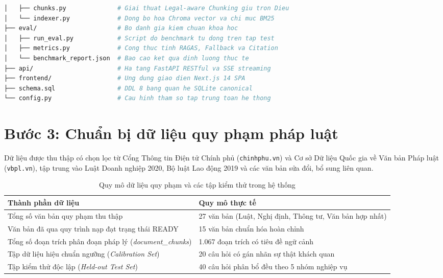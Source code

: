 \begin{lstlisting}[language=bash, caption={Cấu trúc cây thư mục chuẩn hóa của Legal CRAG Assistant}]
│   ├── chunks.py              # Giai thuat Legal-aware Chunking giu tron Dieu
│   └── indexer.py             # Dong bo hoa Chroma vector va chi muc BM25
├── eval/                      # Bo danh gia kiem chuan khoa hoc
│   ├── run_eval.py            # Script do benchmark tu dong tren tap test
│   ├── metrics.py             # Cong thuc tinh RAGAS, Fallback va Citation
│   └── benchmark_report.json  # Bao cao ket qua dinh luong thuc te
├── api/                       # Ha tang FastAPI RESTful va SSE streaming
├── frontend/                  # Ung dung giao dien Next.js 14 SPA
├── schema.sql                 # DDL 8 bang quan he SQLite canonical
└── config.py                  # Cau hinh tham so tap trung toan he thong
\end{lstlisting}

\section{Bước 3: Chuẩn bị dữ liệu quy phạm pháp luật}

Dữ liệu được thu thập có chọn lọc từ Cổng Thông tin Điện tử Chính phủ (\texttt{chinhphu.vn}) và Cơ sở Dữ liệu Quốc gia về Văn bản Pháp luật (\texttt{vbpl.vn}), tập trung vào Luật Doanh nghiệp 2020, Bộ luật Lao động 2019 và các văn bản sửa đổi, bổ sung liên quan.

\begin{table}[htbp]
\centering
\caption{Quy mô dữ liệu quy phạm và các tập kiểm thử trong hệ thống}
\label{tab:corpus_scale}
\renewcommand{\arraystretch}{1.25}
\begin{tabularx}{\textwidth}{L{6.0cm} Y}
\toprule
{}\color{white}\textbf{Thành phần dữ liệu} & \color{white}\textbf{Quy mô thực tế} \\
\midrule
Tổng số văn bản quy phạm thu thập & 27 văn bản (Luật, Nghị định, Thông tư, Văn bản hợp nhất) \\
Văn bản đã qua quy trình nạp đạt trạng thái READY & 15 văn bản chuẩn hóa hoàn chỉnh \\
Tổng số đoạn trích phân đoạn pháp lý (\textit{document\_chunks}) & 1.067 đoạn trích có tiêu đề ngữ cảnh \\
Tập dữ liệu hiệu chuẩn ngưỡng (\textit{Calibration Set}) & 20 câu hỏi có gán nhãn sự thật khách quan \\
Tập kiểm thử độc lập (\textit{Held-out Test Set}) & 40 câu hỏi phân bổ đều theo 5 nhóm nghiệp vụ \\
\bottomrule
\end{tabularx}
\end{table}

